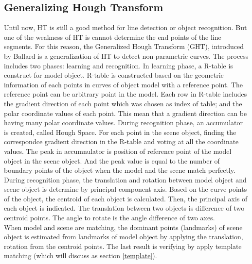 \subsection{Generalizing Hough Transform}
Until now, HT is still a good method for line detection or object recognition. But one of the weakness of HT is cannot determine the end points of the line segments. For this reason, the Generalized Hough Transform (GHT), introduced by Ballard\cite{ballard1981generalizing} is a generalization of HT to detect non-parametric curves. The process includes two phases: learning and recognition. In learning phase, a R-table is construct for model object. R-table is constructed based on the geometric information of each points in curves of object model with a reference point. The reference point can be arbitrary point in the model. Each row in R-table includes the gradient direction of each point which was chosen as index of table; and the polar coordinate values of each point. This mean that a gradient direction can be having many polar coordinate values. During recognition phase, an accumulator is created, called Hough Space. For each point in the scene object, finding the correspondce gradient direction in the R-table and voting at all the coordinate values. The peak in accumnulator is position of reference point of the model object in the scene object. And the peak value is equal to the number of boundary points of the object  when the model and the scene match perfectly.\\[0.2cm]
During recognition phase, the translation and rotation between model object and scene object is determine by principal component axis. Based on the curve points of the object, the centroid of each object is calculated. Then, the principal axis of each object is indicated. The translation between two objects is difference of two centroid points. The angle to rotate is the angle difference of two axes.\\[0.2cm]
When model and scene are matching, the dominant points (landmarks) of scene object is estimated from landmarks of model object by applying the translation, rotation from the centroid points. The last result is verifying by apply template matching (which will discuss as section \ref{template}).
